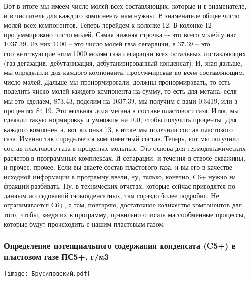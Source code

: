 \documentclass[main.tex]{subfiles}
\begin{document}
Вот в итоге мы имеем число молей всех составляющих, которые и в знаменателе, и в числителе для каждого компонента нам нужны.
В знаменателе общее число молей всех компонентов.
Теперь перейдем к колонке 12.
В колонке 12 просуммировано число молей.
Самая нижняя строчка –- это всего молей у нас 1037.39.
Из них 1000 – это число молей газа сепарации, а 37.39 – это соответствующие этим 1000 молям газа сепарации всех остальных составляющих (газ дегазации, дебутанизация, дебутанизированный конденсат).
И, зная дальше, мы определили для каждого компонента, просуммировав по всем составляющим, число молей.
Дальше мы пронормировали, должны пронормировать, то есть поделить число молей каждого компонента на сумму, то есть для метана, если мы это сделаем, 873.43, поделим на 1037.39, мы получим с вами 0.8419, или в процентах 84.19.
Это мольная доля метана в составе пластового газа.
Итак, мы сделали такую нормировку и умножим на 100, чтобы получить проценты.
Для каждого компонента, вот колонка 13, в итоге мы получили состав пластового газа.
Именно так определяется компонентный состав.
Теперь, вот мы получили состав пластового газа в процентах мольных.
Это основа для термодинамических расчетов в программных комплексах.
И сепарации, и течения в стволе скважины, и прочее, прочее.
Если вы знаете состав пластового газа, и вы его в качестве исходной информации в программу ввели, ну, только, конечно, С6+ нужно на фракции разбивать.
Ну, в технических отчетах, которые сейчас приводятся по данным исследований гаоконденсатных, там гораздо более подробно.
Не ограничивается С6+, а там, повторяю, достаточное количество компонентов для того, чтобы, введя их в программу, правильно описать массообменные процессы, которые будут происходить с нашим пластовым газом.

\subsubsection{Определение потенциального содержания конденсата (C5+) в пластовом газе ПС5+, г/м3}

\begin{center}
\texttt{[image: Брусиловский.pdf]}
\end{center}
\end{document}
